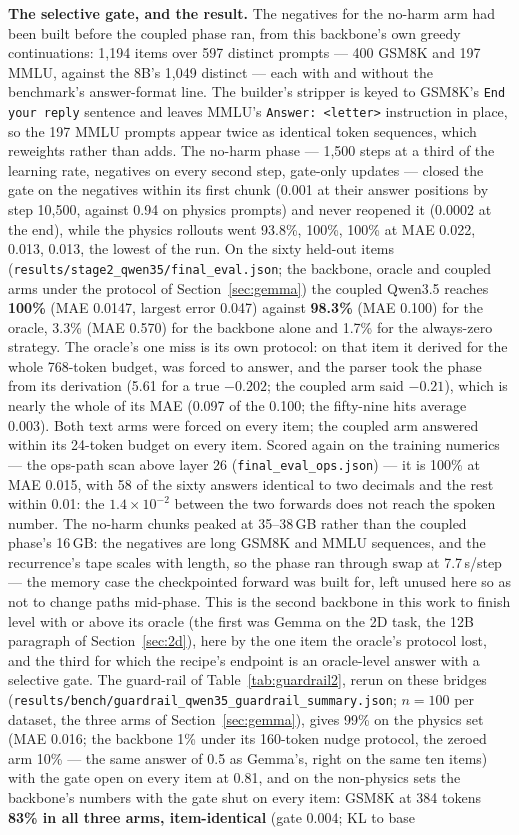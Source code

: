 \documentclass[11pt]{article}
\newcommand{\code}[1]{\texttt{#1}}
\begin{document}
\textbf{The selective gate, and the result.} The negatives for the no-harm arm had been built before the coupled phase ran, from this backbone's own greedy continuations: 1,194 items over 597 distinct prompts --- 400 GSM8K and 197 MMLU, against the 8B's 1,049 distinct --- each with and without the benchmark's answer-format line. The builder's stripper is keyed to GSM8K's \code{End your reply} sentence and leaves MMLU's \code{Answer:\ <letter>} instruction in place, so the 197 MMLU prompts appear twice as identical token sequences, which reweights rather than adds. The no-harm phase --- 1,500 steps at a third of the learning rate, negatives on every second step, gate-only updates --- closed the gate on the negatives within its first chunk (0.001 at their answer positions by step 10,500, against 0.94 on physics prompts) and never reopened it (0.0002 at the end), while the physics rollouts went 93.8\%, 100\%, 100\% at MAE 0.022, 0.013, 0.013, the lowest of the run. On the sixty held-out items (\code{results/stage2\_qwen35/final\_eval.json}; the backbone, oracle and coupled arms under the protocol of Section~\ref{sec:gemma}) the coupled Qwen3.5 reaches \textbf{100\%} (MAE 0.0147, largest error 0.047) against \textbf{98.3\%} (MAE 0.100) for the oracle, 3.3\% (MAE 0.570) for the backbone alone and 1.7\% for the always-zero strategy. The oracle's one miss is its own protocol: on that item it derived for the whole 768-token budget, was forced to answer, and the parser took the phase from its derivation (5.61 for a true $-0.202$; the coupled arm said $-0.21$), which is nearly the whole of its MAE (0.097 of the 0.100; the fifty-nine hits average 0.003). Both text arms were forced on every item; the coupled arm answered within its 24-token budget on every item. Scored again on the training numerics --- the ops-path scan above layer 26 (\code{final\_eval\_ops.json}) --- it is 100\% at MAE 0.015, with 58 of the sixty answers identical to two decimals and the rest within 0.01: the $1.4\times10^{-2}$ between the two forwards does not reach the spoken number. The no-harm chunks peaked at 35--38\,GB rather than the coupled phase's 16\,GB: the negatives are long GSM8K and MMLU sequences, and the recurrence's tape scales with length, so the phase ran through swap at 7.7\,s/step --- the memory case the checkpointed forward was built for, left unused here so as not to change paths mid-phase. This is the second backbone in this work to finish level with or above its oracle (the first was Gemma on the 2D task, the 12B paragraph of Section~\ref{sec:2d}), here by the one item the oracle's protocol lost, and the third for which the recipe's endpoint is an oracle-level answer with a selective gate. The guard-rail of Table~\ref{tab:guardrail2}, rerun on these bridges (\code{results/bench/guardrail\_qwen35\_guardrail\_summary.json}; $n{=}100$ per dataset, the three arms of Section~\ref{sec:gemma}), gives 99\% on the physics set (MAE 0.016; the backbone 1\% under its 160-token nudge protocol, the zeroed arm 10\% --- the same answer of 0.5 as Gemma's, right on the same ten items) with the gate open on every item at 0.81, and on the non-physics sets the backbone's numbers with the gate shut on every item: GSM8K at 384 tokens \textbf{83\% in all three arms, item-identical} (gate 0.004; KL to base 
\end{document}

